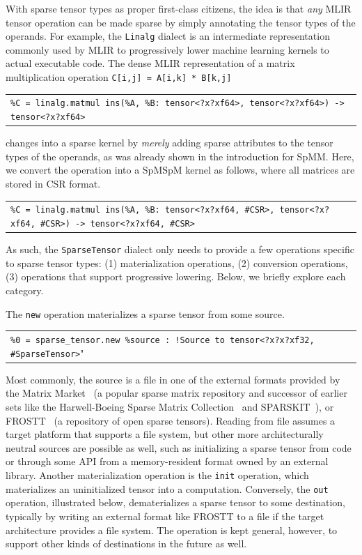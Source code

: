 \documentclass[10pt]{article}
\newcommand{\exam}{\begin{flushleft}\scriptsize\begin{tabular}{l}}
\newcommand{\maxe}{\end{tabular}\end{flushleft}}
\begin{document}
With sparse tensor types as proper first-class citizens, the idea is that \emph{any} MLIR tensor operation can be made sparse by simply annotating the tensor types of the operands. For example, the \texttt{Linalg} dialect is an intermediate representation commonly used by MLIR to progressively lower machine learning kernels to actual executable code. The dense MLIR representation of a matrix multiplication operation \texttt{C[i,j] = A[i,k] * B[k,j]}

\exam
\verb"%C = linalg.matmul ins(%A, %B: tensor<?x?xf64>, tensor<?x?xf64>) -> tensor<?x?xf64>" \\
\maxe
changes into a sparse kernel by \emph{merely} adding sparse attributes to the tensor types of the operands, as was already shown in the introduction for SpMM. Here, we convert the operation into a SpMSpM kernel as follows, where all matrices are stored in CSR format.

\exam
\verb"%C = linalg.matmul ins(%A, %B: tensor<?x?xf64, #CSR>, tensor<?x?xf64, #CSR>) -> tensor<?x?xf64, #CSR>" \\
\maxe

As such, the \texttt{SparseTensor} dialect only needs to provide a few operations specific to sparse tensor types: (1) materialization operations, (2) conversion operations, (3) operations that support progressive lowering. Below, we briefly explore each category.

The \texttt{new} operation materializes a sparse tensor from some source. 

\exam
\verb"%0 = sparse_tensor.new %source : !Source to tensor<?x?x?xf32, #SparseTensor>"
\maxe

Most commonly, the source is a file in one of the external formats provided by the Matrix Market~\cite{matrixmarket} (a popular sparse matrix repository and successor of earlier sets like the Harwell-Boeing Sparse Matrix Collection~\cite{duff2} and SPARSKIT~\cite{saad2}), or FROSTT~\cite{frostt} (a repository of open sparse tensors). Reading from file assumes a target platform that supports a file system, but other more architecturally neutral sources are possible as well, such as initializing a sparse tensor from code or through some API from a memory-resident format owned by an external library. Another materialization operation is the \texttt{init} operation, which materializes an uninitialized tensor into a computation.
Conversely, the \texttt{out} operation, illustrated below, dematerializes a sparse tensor to some destination, typically by writing an external format like FROSTT to a file if the target architecture provides a file system. The operation is kept general, however, to support other kinds of destinations in the future as well.
\end{document}
